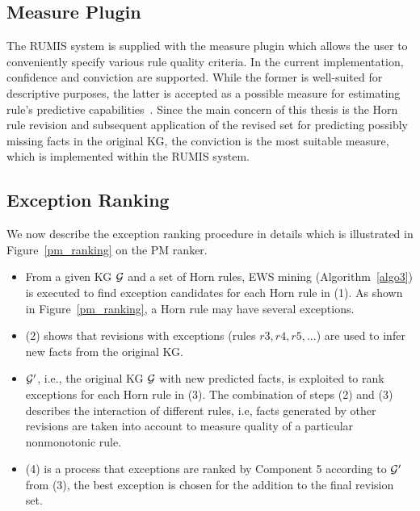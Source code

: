 \subsection{Measure Plugin}

The RUMIS system is supplied with the measure plugin which allows the user to conveniently specify various rule quality criteria. In the current implementation, confidence and conviction are supported. While the former is well-suited for descriptive purposes, the latter is accepted as a possible measure for estimating rule's predictive capabilities~\cite{ref46}. Since the main concern of this thesis is the Horn rule revision and subsequent application of the revised set for predicting possibly missing facts in the original KG, the conviction is the most suitable measure, which is implemented within the RUMIS system.

\subsection{Exception Ranking}
\label{intuition_er}

We now describe the exception ranking procedure in details which is illustrated in Figure~\ref{pm_ranking} on the PM ranker.

\begin{itemize}
\item From a given KG $\mathcal{G}$ and a set of Horn rules, EWS mining (Algorithm~\ref{algo3}) is executed to find exception candidates for each Horn rule in (1). As shown in Figure~\ref{pm_ranking}, a Horn rule may have several exceptions.
\item (2) shows that revisions with exceptions (rules $r3, r4, r5, ...$) are used to infer new facts from the original KG.
\item $\mathcal{G}'$, i.e., the original KG $\mathcal{G}$ with new predicted facts, is exploited to rank exceptions for each Horn rule in (3). The combination of steps (2) and (3) describes the interaction of different rules, i.e, facts generated by other revisions are taken into account to measure quality of a particular nonmonotonic rule.
\item (4) is a process that exceptions are ranked by Component 5 according to $\mathcal{G}'$ from (3), the best exception is chosen for the addition to the final revision set.
\end{itemize}

